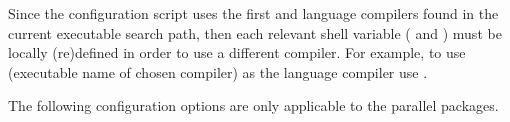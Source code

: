 \begin{config}
  
\item {}
  
\item {}
  
\item {}
  
\item {}
  
  Since the configuration script uses the first {\C} and {\F} language compilers found in the current executable 
  search path, then each relevant shell variable ( and ) must be locally (re)defined in order to 
  use a different compiler.  For example, to use  (executable name of chosen compiler) as the {\C} language 
  compiler use .
  
\end{config}


\vspace{0.25in}
\noindent The following configuration options are only applicable to the parallel {\sundials} packages.

